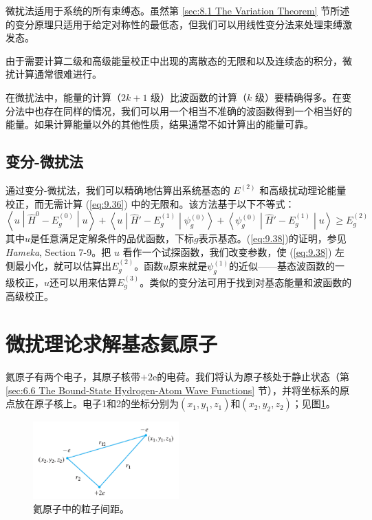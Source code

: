     微扰法适用于系统的所有束缚态。虽然第 \ref{sec:8.1 The Variation Theorem} 节所述的变分原理只适用于给定对称性的最低态，但我们可以用线性变分法来处理束缚激发态。

    由于需要计算二级和高级能量校正中出现的离散态的无限和以及连续态的积分，微扰计算通常很难进行。

    在微扰法中，能量的计算（$2k+1$ 级）比波函数的计算（$k$ 级）要精确得多。在变分法中也存在同样的情况，我们可以用一个相当不准确的波函数得到一个相当好的能量。如果计算能量以外的其他性质，结果通常不如计算出的能量可靠。

\subsection*{变分-微扰法}

    通过变分-微扰法，我们可以精确地估算出系统基态的 $E^{\left(2\right)}$ 和高级扰动理论能量校正，而无需计算 (\ref{eq:9.36}) 中的无限和。该方法基于以下不等式：
    \begin{equation}
        \left\langle u \middle| \hat{H}^0 - E_g^{\left(0\right)} \middle| u \right\rangle + \left\langle u \middle| \hat{H}' - E_g^{\left(1\right)} \middle| \psi_g^{\left(0\right)} \right\rangle + \left\langle \psi_g^{\left(0\right)} \middle| \hat{H}' - E_g^{\left(1\right)} \middle| u \right\rangle \geq E_g^{\left(2\right)}
        \label{eq:9.38}
    \end{equation}
    其中$u$是任意满足定解条件的品优函数，下标$g$表示基态。(\ref{eq:9.38})的证明，参见\textit{Hameka}, Section 7-9。把 $u$ 看作一个试探函数，我们改变参数，使 (\ref{eq:9.38}) 左侧最小化，就可以估算出$E_g^{\left(2\right)}$。函数$u$原来就是$\psi_g^{\left(1\right)}$的近似——基态波函数的一级校正，$u$还可以用来估算$E_g^{\left(3\right)}$。类似的变分法可用于找到对基态能量和波函数的高级校正。

\section{微扰理论求解基态氦原子}
\label{sec:9.3 Perturbation Treatment of the Helium-Atom Ground State}
    氦原子有两个电子，其原子核带$+2\mathrm{e}$的电荷。我们将认为原子核处于静止状态（第 \ref{sec:6.6 The Bound-State Hydrogen-Atom Wave Functions} 节），并将坐标系的原点放在原子核上。电子1和2的坐标分别为$\left(x_1,y_1,z_1\right)$和$\left(x_2,y_2,z_2\right)$；见图\ref{fig:9.1}。
    \begin{figure}[h!]
        \centering
        \includegraphics[width=0.5\textwidth]{Figures/9.1.png}
        \caption{氦原子中的粒子间距。}
        \label{fig:9.1}
    \end{figure}

